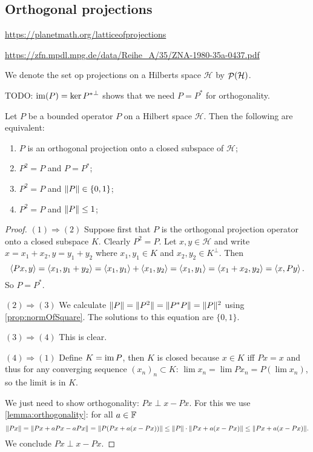 \subsection{Orthogonal projections}
\url{https://planetmath.org/latticeofprojections}

\url{https://zfn.mpdl.mpg.de/data/Reihe_A/35/ZNA-1980-35a-0437.pdf}

We denote the set op projections on a Hilberts space $\mathcal{H}$ by $\mathop{\mathcal{P}}\nolimits(\mathcal{H})$.

TODO: $\operatorname{im}(P) = \ker{P^*}^\perp$ shows that we need $P= P^*$ for orthogonality.

\begin{proposition}
Let $P$ be a bounded operator $P$ on a Hilbert space $\mathcal{H}$. Then the following are equivalent:
\begin{enumerate}
\item $P$ is an orthogonal projection onto a closed subspace of $\mathcal{H}$;
\item $P^2 = P$ and $P=P^*$;
\item $P^2 = P$ and $\lVert P\rVert\in \{0,1\}$;
\item $P^2 = P$ and $\lVert P\rVert\leq 1$;
\end{enumerate}
\end{proposition}
\begin{proof}
$\boxed{(1)\Rightarrow (2)}$  Suppose first that $P$ is the orthogonal projection operator onto a closed subspace $K$. Clearly $P^2 = P$. Let $x,y\in\mathcal{H}$ and write $x= x_1+x_2, y = y_1+y_2$ where $x_1,y_1\in K$ and $x_2,y_2\in K^\perp$. Then
\[ \left\langle Px, y \right\rangle = \left\langle x_1, y_1+y_2 \right\rangle = \left\langle x_1, y_1 \right\rangle + \left\langle x_1,y_2 \right\rangle = \left\langle x_1,y_1 \right\rangle = \left\langle x_1+x_2, y_2 \right\rangle = \left\langle x,Py \right\rangle. \]
So $P = P^*$.

$\boxed{(2)\Rightarrow (3)}$ We calculate $\lVert P\rVert = \lVert P^2\rVert = \lVert P^*P\rVert = \lVert P\rVert^2$ using \ref{prop:normOfSquare}. The solutions to this equation are $\{0,1\}$.

$\boxed{(3)\Rightarrow (4)}$ This is clear.

$\boxed{(4)\Rightarrow (1)}$ Define $K=\operatorname{im} P$, then $K$ is closed because $x\in K$ iff $Px=x$ and thus for any converging sequence $(x_n)_n\subset K$: $\lim x_n = \lim Px_n = P\left(\lim x_n\right)$, so the limit is in $K$.

We just need to show orthogonality: $Px \perp x- Px$. For this we use \ref{lemma:orthogonality}: for all $a\in\mathbb{F}$
\[ \lVert Px\rVert = \lVert Px + aPx - aPx\rVert = \lVert P(Px + a(x-Px))\rVert \leq \lVert P\rVert\cdot \lVert Px + a(x-Px)\rVert \leq \lVert Px + a(x-Px)\rVert. \]
We conclude $Px \perp x- Px$.
\end{proof}

